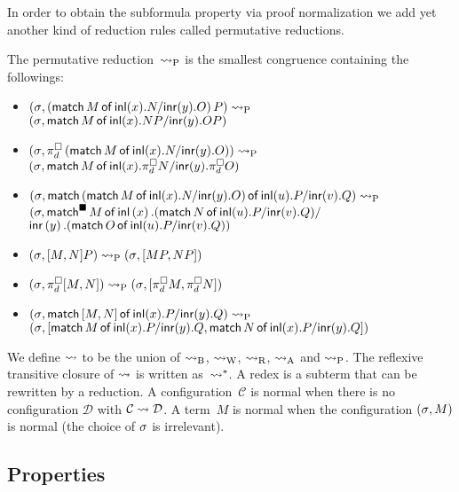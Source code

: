{In order to obtain the subformula property
 via proof normalization
we add yet another kind of reduction rules called permutative reductions.
\begin{definition}
 The permutative reduction~$\preduce$ is the smallest congruence
 containing the followings:
\begin{itemize}
 \small
 \item $\conf{}{ \left(\mat  M x N y O\right) P }\preduce$ \\
       $\conf{}{ \mat M x {N P} y {O P} }$
 \item $\conf{}{ \pi^\square_d \left(\mat M x N y
       O\right)}\preduce$\\
       $\conf{}{ \mat M x
       {\pi^\square_d N} y {\pi^\square_d O} }$
 \item {
       $\conf{}{ \mat
                          {\left(\mat  M x N y O\right)}
                          u P v Q
                      }\preduce$ \\
       $(\lstore,
        \mathsf{match}^{\blacksquare}\,{M}\,\mathsf{of}\, \linl{x}. {
                          {\left(\mat N u P v Q\right)}
       } /$ \\ \phantom{mmmmmmmmmmm}$
       \linr{y}. {\left(\mat  O u P v Q\right)}
                      )
       $}
 \item $\conf{}{ \cotuple{M, N} P }\preduce
        \conf{}{ \cotuple{MP, NP} }$
 \item $\conf{}{ \pi^\square_d\cotuple{M,N} }\preduce
        \conf{}{ \cotuple{\pi^\square_d M, \pi^\square_d N} }$
 \item $\conf{}{ \mat {\cotuple{M,N}} x P y Q }\preduce$\\
       $\conf{}{ \cotuple{
                          \mat  M x P y Q,
                          \mat N x P y Q
                        } }$
\end{itemize}
\end{definition}

We define $\reduce$ to be the union of $\breduce$, $\wreduce$, $\rreduce$,
$\areduce$ and $\preduce$.
The reflexive transitive closure of $\reduce$ is
written as~$\reduction$.
A redex is a subterm that can be rewritten by a reduction.
A configuration~$\mathcal{C}$ is normal when there is no configuration
$\mathcal{D}$ with $\mathcal{C}\reduce \mathcal{D}$.
A term~$M$ is normal when the configuration $\conf{}{M}$ is
normal (the choice of $\lstore$ is irrelevant).

\subsection{Properties}

}
